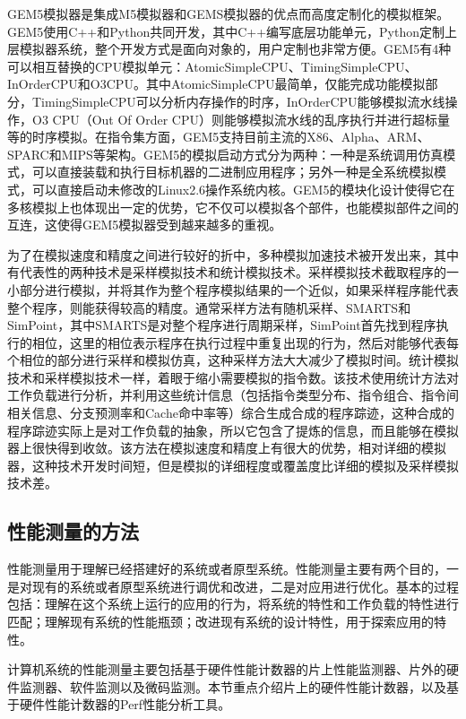 \documentclass[]{ctexbook}
\begin{document}
GEM5模拟器是集成M5模拟器和GEMS模拟器的优点而高度定制化的模拟框架。GEM5使用C++和Python共同开发，其中C++编写底层功能单元，Python定制上层模拟器系统，整个开发方式是面向对象的，用户定制也非常方便。GEM5有4种可以相互替换的CPU模拟单元：AtomicSimpleCPU、TimingSimpleCPU、InOrderCPU和O3CPU。其中AtomicSimpleCPU最简单，仅能完成功能模拟部分，TimingSimpleCPU可以分析内存操作的时序，InOrderCPU能够模拟流水线操作，O3 CPU（Out Of Order CPU）则能够模拟流水线的乱序执行并进行超标量等的时序模拟。在指令集方面，GEM5支持目前主流的X86、Alpha、ARM、SPARC和MIPS等架构。GEM5的模拟启动方式分为两种：一种是系统调用仿真模式，可以直接装载和执行目标机器的二进制应用程序；另外一种是全系统模拟模式，可以直接启动未修改的Linux2.6操作系统内核。GEM5的模块化设计使得它在多核模拟上也体现出一定的优势，它不仅可以模拟各个部件，也能模拟部件之间的互连，这使得GEM5模拟器受到越来越多的重视。

为了在模拟速度和精度之间进行较好的折中，多种模拟加速技术被开发出来，其中有代表性的两种技术是采样模拟技术和统计模拟技术。采样模拟技术截取程序的一小部分进行模拟，并将其作为整个程序模拟结果的一个近似，如果采样程序能代表整个程序，则能获得较高的精度。通常采样方法有随机采样、SMARTS和SimPoint，其中SMARTS是对整个程序进行周期采样，SimPoint首先找到程序执行的相位，这里的相位表示程序在执行过程中重复出现的行为，然后对能够代表每个相位的部分进行采样和模拟仿真，这种采样方法大大减少了模拟时间。统计模拟技术和采样模拟技术一样，着眼于缩小需要模拟的指令数。该技术使用统计方法对工作负载进行分析，并利用这些统计信息（包括指令类型分布、指令组合、指令间相关信息、分支预测率和Cache命中率等）综合生成合成的程序踪迹，这种合成的程序踪迹实际上是对工作负载的抽象，所以它包含了提炼的信息，而且能够在模拟器上很快得到收敛。该方法在模拟速度和精度上有很大的优势，相对详细的模拟器，这种技术开发时间短，但是模拟的详细程度或覆盖度比详细的模拟及采样模拟技术差。

\hypertarget{ux6027ux80fdux6d4bux91cfux7684ux65b9ux6cd5}{%
\subsection{性能测量的方法}\label{ux6027ux80fdux6d4bux91cfux7684ux65b9ux6cd5}}

性能测量用于理解已经搭建好的系统或者原型系统。性能测量主要有两个目的，一是对现有的系统或者原型系统进行调优和改进，二是对应用进行优化。基本的过程包括：理解在这个系统上运行的应用的行为，将系统的特性和工作负载的特性进行匹配；理解现有系统的性能瓶颈；改进现有系统的设计特性，用于探索应用的特性。

计算机系统的性能测量主要包括基于硬件性能计数器的片上性能监测器、片外的硬件监测器、软件监测以及微码监测。本节重点介绍片上的硬件性能计数器，以及基于硬件性能计数器的Perf性能分析工具。
\end{document}
